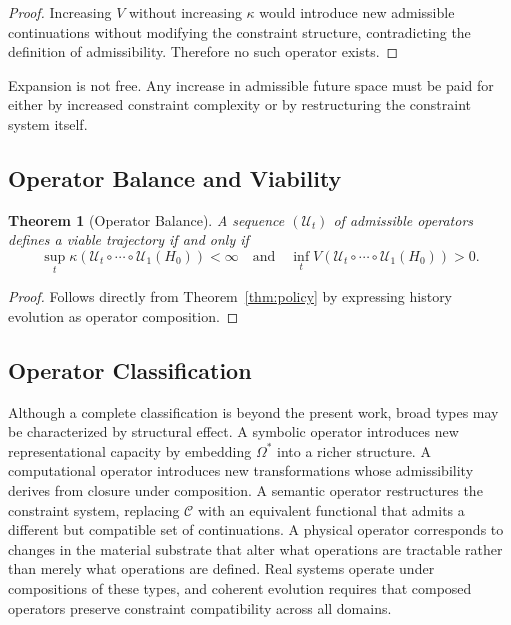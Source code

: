 \documentclass[12pt, a4paper]{article}
\theoremstyle{plain}
\newtheorem{theorem}{Theorem}[section]
\theoremstyle{definition}
\theoremstyle{remark}
\begin{document}
\begin{proof}
Increasing $V$ without increasing $\kappa$ would introduce new admissible continuations without modifying the constraint structure, contradicting the definition of admissibility. Therefore no such operator exists.
\end{proof}

Expansion is not free. Any increase in admissible future space must be paid for either by increased constraint complexity or by restructuring the constraint system itself.

\subsection{Operator Balance and Viability}

\begin{theorem}[Operator Balance]
A sequence $(\mathcal{U}_t)$ of admissible operators defines a viable trajectory if and only if
\[
\sup_t \kappa(\mathcal{U}_t \circ \cdots \circ \mathcal{U}_1(H_0)) < \infty
\quad \text{and} \quad
\inf_t V(\mathcal{U}_t \circ \cdots \circ \mathcal{U}_1(H_0)) > 0.
\]
\end{theorem}

\begin{proof}
Follows directly from Theorem~\ref{thm:policy} by expressing history evolution as operator composition.
\end{proof}

\subsection{Operator Classification}

Although a complete classification is beyond the present work, broad types may be characterized by structural effect. A symbolic operator introduces new representational capacity by embedding $\Omega^*$ into a richer structure. A computational operator introduces new transformations whose admissibility derives from closure under composition. A semantic operator restructures the constraint system, replacing $\mathcal{C}$ with an equivalent functional that admits a different but compatible set of continuations. A physical operator corresponds to changes in the material substrate that alter what operations are tractable rather than merely what operations are defined. Real systems operate under compositions of these types, and coherent evolution requires that composed operators preserve constraint compatibility across all domains.
\end{document}
